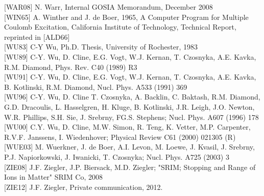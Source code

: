 \documentclass[10pt]{article}
\begin{document}
[WAR08] N. Warr, Internal GOSIA Memorandum, December 2008\\[0pt]
[WIN65] A. Winther and J. de Boer, 1965, A Computer Program for Multiple Coulomb Excitation, California Institute of Technology, Technical Report, reprinted in [ALD66]\\[0pt]
[WU83] C-Y Wu, Ph.D. Thesis, University of Rochester, 1983\\[0pt]
[WU89] C-Y. Wu, D. Cline, E.G. Vogt, W.J. Kernan, T. Czosnyka, A.E. Kavka, R.M. Diamond, Phys. Rev. C40 (1989) R3\\[0pt]
[WU91] C-Y. Wu, D. Cline, E.G. Vogt, W.J. Kernan, T. Czosnyka, A.E. Kavka, B. Kotlinski, R.M. Diamond, Nucl. Phys. A533 (1991) 369\\[0pt]
[WU96] C-Y. Wu, D. Cline T. Czosnyka, A. Backlin, C. Baktash, R.M. Diamond, G.D. Dracoulis, L. Hasselgren, H. Kluge, B. Kotlinski, J.R. Leigh, J.O. Newton, W.R. Phillips, S.H. Sie, J. Srebrny, FG.S. Stephens; Nucl. Phys. A607 (1996) 178\\[0pt]
[WU00] C.Y. Wu, D. Cline, M.W. Simon, R. Teng, K. Vetter, M.P. Carpenter, R.V.F. Janssens, I. Wiedenhover; Physical Review C61 (2000) 021305 (R)\\[0pt]
[WUE03] M. Wuerkner, J. de Boer, A.I. Levon, M. Loewe, J. Kvasil, J. Srebrny, P.J. Napiorkowski, J. Iwanicki, T. Czosnyka; Nucl. Phys. A725 (2003) 3\\[0pt]
[ZIE08] J.F. Ziegler, J.P. Biersack, M.D. Ziegler; "SRIM; Stopping and Range of Ions in Matter" SRIM Co, 2008\\[0pt]
[ZIE12] J.F. Ziegler, Private communication, 2012.
\end{document}

